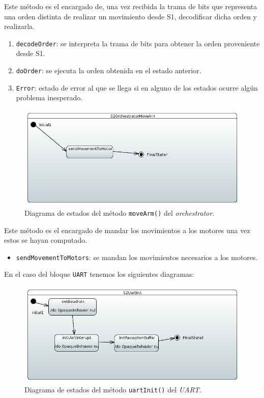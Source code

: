 Este método es el encargado de, una vez recibida la trama de bits que representa una orden distinta de realizar un movimiento desde S1, decodificar dicha orden y realizarla.

\begin{enumerate}
    \item \texttt{decodeOrder}: se interpreta la trama de bits para obtener la orden proveniente desde S1.
    \item \texttt{doOrder}: se ejecuta la orden obtenida en el estado anterior.
    \item \texttt{Error}: estado de error al que se llega si en alguno de los estados ocurre algún problema inesperado. 
\end{enumerate}

\begin{figure}[H]
    \centering
    \includegraphics[width=1\linewidth]{pictures/S2OrchestratorMoveArm.PNG}
    \caption{Diagrama de estados del método \texttt{moveArm()} del \textit{orchestrator}.}
    \label{fig:fun_move_arm_orchestator}
\end{figure}

Este método es el encargado de mandar los movimientos a los motores una vez estos se hayan computado.

\begin{itemize}
    \item \texttt{sendMovementToMotors}: se mandan los movimientos necesarios a los motores.
    
\end{itemize}

En el caso del bloque \texttt{UART} tenemos los siguientes diagramas:

\begin{figure}[H]
    \centering
    \includegraphics[width=1\linewidth]{pictures/S2UartInit.PNG}
    \caption{Diagrama de estados del método \texttt{uartInit()} del \textit{UART}.}
    \label{fig:fun_uart_init_uart}
\end{figure}

